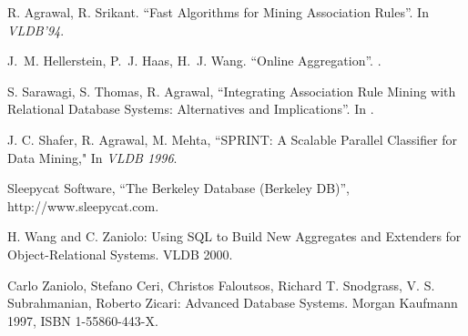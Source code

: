 \begin{thebibliography}{aaaa}

 R. Agrawal, R. Srikant.
\newblock ``Fast Algorithms for Mining Association Rules''.
\newblock In {\em VLDB'94}.


 J.~M. Hellerstein, P.~J. Haas, H.~J.
Wang.  \newblock ``Online Aggregation''.  .


 S. Sarawagi, S. Thomas, R.  Agrawal,
\newblock ``Integrating Association Rule Mining with Relational
Database Systems: Alternatives and Implications''. In .


 J. C. Shafer, R. Agrawal, M. Mehta, \newblock
``SPRINT: A Scalable Parallel Classifier for Data Mining,"
\newblock In {\em VLDB 1996}.

 Sleepycat Software, ``The Berkeley Database
(Berkeley DB)'', \newblock http://www.sleepycat.com.

H. Wang and C. Zaniolo:
\newblock Using SQL to Build New Aggregates and Extenders for Object-Relational
Systems.
\newblock VLDB 2000.

Carlo Zaniolo, Stefano Ceri, Christos Faloutsos,
Richard T. Snodgrass, V. S. Subrahmanian, Roberto Zicari:
Advanced Database Systems. Morgan Kaufmann 1997, ISBN 1-55860-443-X.
\end{thebibliography}

